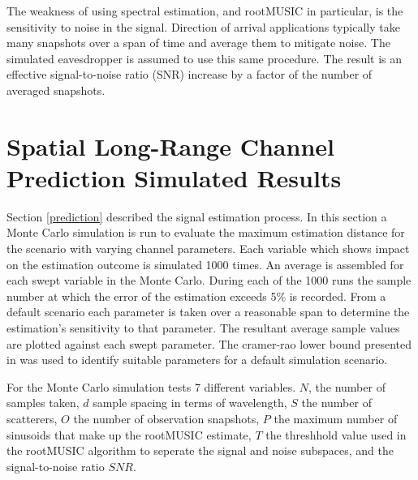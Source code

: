 \documentclass{allertonproc}
\begin{document}

The weakness of using spectral estimation, and rootMUSIC in particular, is the sensitivity to noise in the signal. Direction of arrival applications typically take many snapshots over a span of time and average them to mitigate noise. The simulated eavesdropper is assumed to use this same procedure. The result is an effective signal-to-noise ratio (SNR) increase by a factor of the number of averaged snapshots. 



\section{Spatial Long-Range Channel Prediction Simulated Results}\label{simresults}

Section \ref{prediction} described the signal estimation process. In this section a Monte Carlo simulation is run to evaluate the maximum estimation distance for the scenario with varying channel parameters. Each variable which shows impact on the estimation outcome is simulated 1000 times. An average is assembled for each swept variable in the Monte Carlo. During each of the 1000 runs the sample number at which the error of the estimation exceeds 5\% is recorded. From a default scenario each parameter is taken over a reasonable span to determine the estimation's sensitivity to that parameter. The resultant average sample values are plotted against each swept parameter. The cramer-rao lower bound presented in \cite{kckpVTC2015} was used to identify suitable parameters for a default simulation scenario.  %

For the Monte Carlo simulation tests 7 different variables. $N$, the number of samples taken, $d$ sample spacing in terms of wavelength, $S$ the number of scatterers, $O$ the number of observation snapshots, $P$ the maximum number of sinusoids that make up the rootMUSIC estimate, $T$ the threshhold value used in the rootMUSIC algorithm to seperate the signal and noise subspaces, and the signal-to-noise ratio $SNR$.

\end{document}
